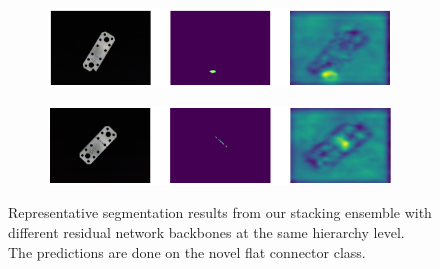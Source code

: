 \begin{figure}[H]
\begin{subfigure}[b]{0.3\textwidth}
    \end{subfigure}
    \begin{subfigure}[b]{0.3\textwidth}
        \centering
        \includegraphics[width=\textwidth]{figures/ensembleimagesFC/image_prediction_073.png}


    \end{subfigure}
    \begin{subfigure}[b]{0.3\textwidth}
        \centering
        \includegraphics[width=\textwidth]{figures/ensembleimagesFC/image_prediction_085.png}


    \end{subfigure}
    \caption{Representative segmentation results from our stacking ensemble with different residual network backbones at the same hierarchy level. The predictions are done on the novel flat 
             connector class.}
    \label{fig:ensembleFCimages}
\end{figure}
